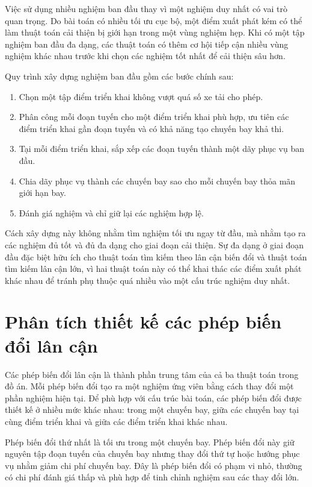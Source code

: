Việc sử dụng nhiều nghiệm ban đầu thay vì một nghiệm duy nhất có vai trò quan trọng. Do bài toán có nhiều tối ưu cục bộ, một điểm xuất phát kém có thể làm thuật toán cải thiện bị giới hạn trong một vùng nghiệm hẹp. Khi có một tập nghiệm ban đầu đa dạng, các thuật toán có thêm cơ hội tiếp cận nhiều vùng nghiệm khác nhau trước khi chọn các nghiệm tốt nhất để cải thiện sâu hơn.

Quy trình xây dựng nghiệm ban đầu gồm các bước chính sau:
\begin{enumerate}[leftmargin=1.2cm]
    \item Chọn một tập điểm triển khai không vượt quá số xe tải cho phép.
    \item Phân công mỗi đoạn tuyến cho một điểm triển khai phù hợp, ưu tiên các điểm triển khai gần đoạn tuyến và có khả năng tạo chuyến bay khả thi.
    \item Tại mỗi điểm triển khai, sắp xếp các đoạn tuyến thành một dãy phục vụ ban đầu.
    \item Chia dãy phục vụ thành các chuyến bay sao cho mỗi chuyến bay thỏa mãn giới hạn bay.
    \item Đánh giá nghiệm và chỉ giữ lại các nghiệm hợp lệ.
\end{enumerate}

Cách xây dựng này không nhằm tìm nghiệm tối ưu ngay từ đầu, mà nhằm tạo ra các nghiệm đủ tốt và đủ đa dạng cho giai đoạn cải thiện. Sự đa dạng ở giai đoạn đầu đặc biệt hữu ích cho thuật toán tìm kiếm theo lân cận biến đổi và thuật toán tìm kiếm lân cận lớn, vì hai thuật toán này có thể khai thác các điểm xuất phát khác nhau để tránh phụ thuộc quá nhiều vào một cấu trúc nghiệm duy nhất.

\section{Phân tích thiết kế các phép biến đổi lân cận}

Các phép biến đổi lân cận là thành phần trung tâm của cả ba thuật toán trong đồ án. Mỗi phép biến đổi tạo ra một nghiệm ứng viên bằng cách thay đổi một phần nghiệm hiện tại. Để phù hợp với cấu trúc bài toán, các phép biến đổi được thiết kế ở nhiều mức khác nhau: trong một chuyến bay, giữa các chuyến bay tại cùng điểm triển khai và giữa các điểm triển khai khác nhau.

Phép biến đổi thứ nhất là tối ưu trong một chuyến bay. Phép biến đổi này giữ nguyên tập đoạn tuyến của chuyến bay nhưng thay đổi thứ tự hoặc hướng phục vụ nhằm giảm chi phí chuyến bay. Đây là phép biến đổi có phạm vi nhỏ, thường có chi phí đánh giá thấp và phù hợp để tinh chỉnh nghiệm sau các thay đổi lớn.

